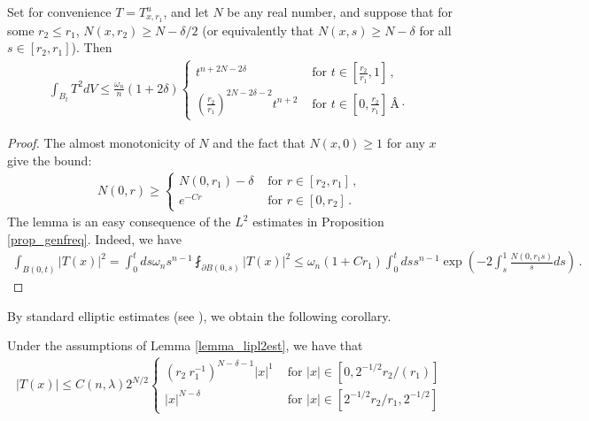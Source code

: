 \documentclass[11pt]{article}
\begin{document}
\begin{lemma}\label{lemma_lipl2est}
Set for convenience $T=T^u_{x,r_1}$, and let $N$ be any real number, and suppose that for some $r_2\leq r_1$, $N(x,r_2)\geq N-\delta/2$ (or equivalently that $N(x,s)\geq N-\delta$ for all $s\in[r_2,r_1]$). Then 
\begin{gather}
 \int_{B_t} T^2dV \leq \frac{\omega_n}{n} (1+2\delta)\begin{cases}
                                             t^{n+2N-2\delta} & \text{ for } t\in{\left[{\frac{r_2}{r_1},1}\right]}\, ,\\
                                             {\left({\frac{r_2}{r_1}}\right)}^{2N-2\delta-2} t^{n+2} & \text{ for } t\in{\left[{0,\frac{r_2}{r_1}}\right]}\, Â·
                                            \end{cases}
\end{gather}
\end{lemma}
\begin{proof}
The almost monotonicity of $N$ and the fact that $N(x,0)\geq 1$ for any $x$ give the bound:
\begin{gather}
 N(0,r)\geq \begin{cases}
				      N(0,r_1)-\delta & \text{ for } r\in [r_2,r_1]\, ,\\
				      e^{-Cr}  & \text{ for } r\in [0,r_2]\, .
				     \end{cases}
\end{gather}
The lemma is an easy consequence of the $L^2$ estimates in Proposition \ref{prop_genfreq}. Indeed, we have
\begin{gather}
 \int_{B(0,t)} {\left|{T(x)}\right|}^2 = \int_{0}^t ds \omega_n s^{n-1} \fint_{\partial B(0,s)} {\left|{T(x)}\right|}^2 \leq \omega_n (1+Cr_1)\int_0^t ds s^{n-1} \exp{\left({-2\int_s ^1 \frac{N(0,r_1 s)} s ds }\right)}\, .
\end{gather}

\end{proof}

By standard elliptic estimates (see \cite[theorem 8.24]{GT}), we obtain the following corollary.
\begin{corollary}\label{cor_lipabsest}
 Under the assumptions of Lemma \ref{lemma_lipl2est}, we have that
 \begin{gather}
  {\left|{T(x)}\right|} \leq C(n,\lambda)	2^{N/2}\begin{cases}
				 {\left({r_2\ r_1^{-1}}\right)}^{N-\delta-1} {\left|x\right|}^{1} & \text{ for } {\left|x\right|} \in [0,2^{-1/2}r_2/(r_1)]\\
				 {\left|x\right|}^{N-\delta} & \text{ for } {\left|x\right|} \in [2^{-1/2}r_2/r_1,2^{-1/2}]
				\end{cases}
 \end{gather}
\end{corollary}
\end{document}
